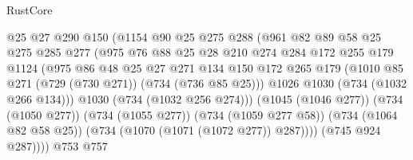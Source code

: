 \begin{lexlean}{RustCore}
\begin{coremodule}
                                  @25
                                  @27
                                  @290
                                  @150
                                  (@1154
                                    @90
                                    @25
                                    @275
                                    @288
                                    (@961
                                      @82
                                      @89
                                      @58
                                      @25
                                      @275
                                      @285
                                      @277
                                      (@975
                                        @76
                                        @88
                                        @25
                                        @28
                                        @210
                                        @274
                                        @284
                                        @172
                                        @255
                                        @179
                                        @1124
                                        (@975
                                          @86
                                          @48
                                          @25
                                          @27
                                          @271
                                          @134
                                          @150
                                          @172
                                          @265
                                          @179
                                          (@1010 @85 @271 (@729 (@730 @271)) (@734 (@736 @85 @25)))
                                          @1026
                                          @1030
                                          (@734 (@1032 @266 @134)))
                                        @1030
                                        (@734 (@1032 @256 @274)))
                                      (@1045 (@1046 @277))
                                      (@734 (@1050 @277))
                                      (@734 (@1055 @277))
                                      (@734 (@1059 @277 @58))
                                      (@734 (@1064 @82 @58 @25))
                                      (@734 (@1070 (@1071 (@1072 @277)) @287))))
                                  (@745 @924 @287))))
                            @753
                            @757

\end{coremodule}
\end{lexlean}
